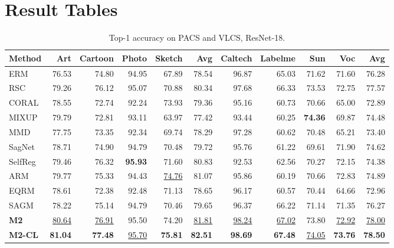 \documentclass{article}
\begin{document}
\section*{Result Tables}

\begin{table}[htbp]
\centering
\caption{Top-1 accuracy on PACS and VLCS, ResNet-18.}
\scriptsize
\begin{adjustbox}{max width=\textwidth}
\begin{tabular}{lrrrrrrrrrr}
\toprule
Method & Art & Cartoon & Photo & Sketch & Avg & Caltech & Labelme & Sun & Voc & Avg \\
\midrule
ERM & 76.53 & 74.80 & 94.95 & 67.89 & 78.54 & 96.87 & 65.03 & 71.62 & 71.60 & 76.28 \\
RSC & 79.26 & 76.12 & 95.07 & 70.88 & 80.34 & 97.68 & 66.33 & 73.53 & 72.75 & 77.57 \\
CORAL & 78.55 & 72.74 & 92.24 & 73.93 & 79.36 & 95.16 & 60.73 & 70.66 & 65.00 & 72.89 \\
MIXUP & 79.79 & 72.81 & 93.11 & 63.97 & 77.42 & 93.44 & 60.25 & \textbf{74.36} & 69.87 & 74.48 \\
MMD & 77.75 & 73.35 & 92.34 & 69.74 & 78.29 & 97.28 & 60.62 & 70.48 & 65.21 & 73.40 \\
SagNet & 78.71 & 74.90 & 94.79 & 70.48 & 79.72 & 95.76 & 61.22 & 69.61 & 71.90 & 74.62 \\
SelfReg & 79.46 & 76.32 & \textbf{95.93} & 71.60 & 80.83 & 92.53 & 62.56 & 70.27 & 72.15 & 74.38 \\
ARM & 79.77 & 75.33 & 94.43 & \underline{74.76} & 81.07 & 95.86 & 60.19 & 70.66 & 72.83 & 74.89 \\
EQRM & 78.61 & 72.38 & 92.48 & 71.13 & 78.65 & 96.17 & 60.57 & 70.44 & 64.66 & 72.96 \\
SAGM & 78.22 & 75.14 & 94.79 & 70.46 & 79.65 & 96.37 & 66.22 & 71.14 & 71.35 & 76.27 \\
\midrule
\textbf{M2} & \underline{80.64} & \underline{76.91} & 95.50 & 74.20 & \underline{81.81} & \underline{98.24} & \underline{67.02} & 73.80 & \underline{72.92} & \underline{78.00} \\
\textbf{M2-CL} & \textbf{81.04} & \textbf{77.48} & \underline{95.70} & \textbf{75.81} & \textbf{82.51} & \textbf{98.69} & \textbf{67.48} & \underline{74.05} & \textbf{73.76} & \textbf{78.50} \\
\bottomrule
\end{tabular}
\end{adjustbox}
\end{table}
\end{document}
